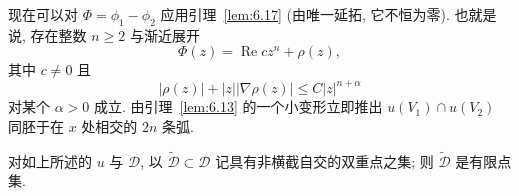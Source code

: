 现在可以对 $\Phi=\phi_1-\phi_2$ 应用引理~\ref{lem:6.17} (由唯一延拓,
它不恒为零). 也就是说, 存在整数 $n\geq2$ 与渐近展开
\begin{equation}
\Phi(z)=\operatorname{Re}cz^n+\rho(z),
\label{eq:6.121}
\end{equation}
其中 $c\neq0$ 且
\begin{equation}
|\rho(z)|+|z||\nabla\rho(z)|\leq C|z|^{n+\alpha}
\label{eq:6.122}
\end{equation}
对某个 $\alpha>0$ 成立. 由引理~\ref{lem:6.13} 的一个小变形立即推出
$u(V_1)\cap u(V_2)$ 同胚于在 $x$ 处相交的 $2n$ 条弧.

\begin{lemma}
\label{lem:6.32}
对如上所述的 $u$ 与 $\mathcal{D}$, 以
$\tilde{\mathcal{D}}\subset\mathcal{D}$ 记具有非横截自交的双重点之集;
则 $\tilde{\mathcal{D}}$ 是有限点集.
\end{lemma}

